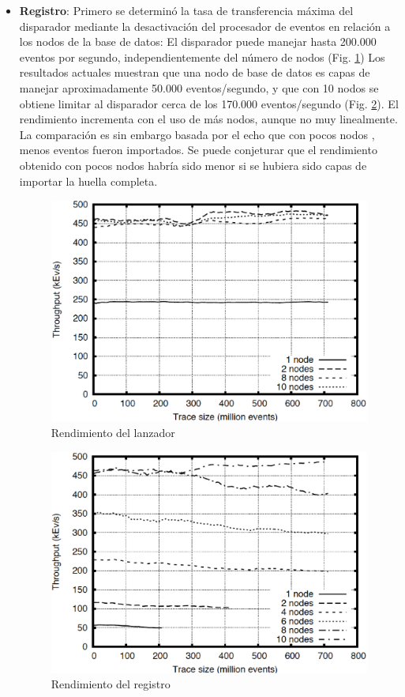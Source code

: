 \documentclass[12pt,legalpaper]{report}
\begin{document}
\begin{itemize}
	\item \textbf{Registro}: Primero se determinó la tasa de transferencia máxima del disparador mediante la desactivación del procesador de eventos en relación a los nodos de la base de datos:  El disparador puede manejar hasta 200.000 eventos por segundo, independientemente del número de nodos (Fig. \ref{BenchDispatch})  Los resultados actuales muestran que una nodo de base de datos es capas de manejar aproximadamente 50.000 eventos/segundo, y que con 10 nodos se obtiene limitar al disparador cerca de los 170.000 eventos/segundo (Fig. \ref{DB}).  El rendimiento incrementa con el uso de más nodos, aunque no muy linealmente.  La comparación es sin embargo basada por el echo que con pocos nodos , menos eventos fueron importados.  Se puede conjeturar que el rendimiento obtenido con pocos nodos habría sido menor si se hubiera sido capas de importar la huella completa.

\begin{figure}[h]
	\centering
	\includegraphics[scale=0.3]{images/TOD/BenchDispatch.eps}
	\caption{Rendimiento del lanzador}
	\label{BenchDispatch}
\end{figure}		

\begin{figure}[h]
	\centering
	\includegraphics[scale=0.3]{images/TOD/BenchDBThroughput.eps}
	\caption{Rendimiento del registro}
	\label{DB}
\end{figure}


\end{itemize}
\end{document}
